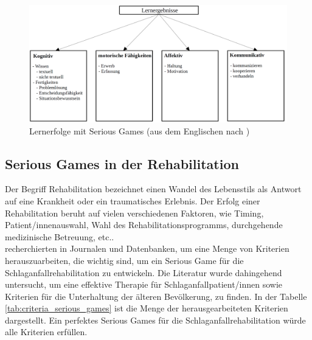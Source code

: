 \begin{figure}[h]
    \centering
	\includegraphics[width=0.8\linewidth]{figures/serious_games/learning_outcomes_deu}
	\caption{Lernerfolge mit Serious Games (aus dem Englischen nach \cite{wouters:2009:practices})}
	\label{fig:serious_games_outcomes}
\end{figure}

\subsection{Serious Games in der Rehabilitation}
Der Begriff Rehabilitation bezeichnet einen Wandel des Lebensstils als Antwort auf eine Krankheit oder ein traumatisches Erlebnis. Der Erfolg einer Rehabilitation beruht auf vielen verschiedenen Faktoren, wie Timing, Patient/innenauswahl, Wahl des Rehabilitationsprogramms, durchgehende medizinische Betreuung, \ac{etc.}. \cite{gunasekera:2005:rehabilitation} \\ %
\citeauthor{flores:2008:IPM:1501750.1501839} recherchierten in Journalen und Datenbanken, um eine Menge von Kriterien herauszuarbeiten, die wichtig sind, um ein Serious Game für die Schlaganfallrehabilitation zu entwickeln. Die Literatur wurde dahingehend untersucht, um eine effektive Therapie für Schlaganfallpatient/innen sowie Kriterien für die Unterhaltung der älteren Bevölkerung, zu finden. In der Tabelle \ref{tab:criteria_serious_games} ist die Menge der herausgearbeiteten Kriterien dargestellt. Ein perfektes Serious Games für die Schlaganfallrehabilitation würde alle Kriterien erfüllen. \cite{flores:2008:IPM:1501750.1501839} 



